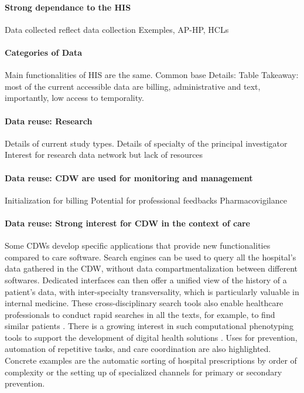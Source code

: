 \documentclass{report}
\begin{document}
\paragraph{Strong dependance to the HIS}

Data collected reflect data collection
Exemples, AP-HP, HCLs

\paragraph{Categories of Data}

Main functionalities of HIS are the same. Common base Details: Table Takeaway:
most of the current accessible data are billing, administrative and text,
importantly, low access to temporality.

\paragraph{Data reuse: Research}
Details of current study types.
Details of specialty of the principal investigator
Interest for research data network but lack of resources

\paragraph{Data reuse: CDW are used for monitoring and management}
Initialization for billing
Potential for professional feedbacks
Pharmacovigilance

\paragraph{Data reuse: Strong interest for CDW in the context of care}

Some CDWs develop specific applications that provide new functionalities
compared to care software. Search engines can be used to query all the
hospital's data gathered in the CDW, without data compartmentalization between
different softwares. Dedicated interfaces can then offer a unified view of the
history of a patient's data, with inter-specialty transversality, which is
particularly valuable in internal medicine. These cross-disciplinary search
tools also enable healthcare professionals to conduct rapid searches in all the
texts, for example, to find similar patients \citep{garcelon2017finding}.
%
There is a growing interest in such computational phenotyping tools to support
the development of digital health solutions \citep{wen2023impact}.
%
Uses for prevention, automation of repetitive tasks, and care coordination are
also highlighted. Concrete examples are the automatic sorting of hospital
prescriptions by order of complexity or the setting up of specialized channels
for primary or secondary prevention.
\end{document}
